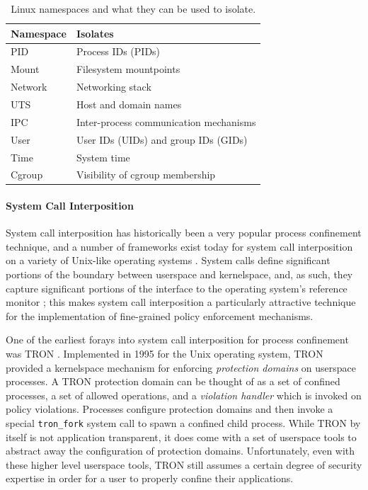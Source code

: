 \documentclass[dvipsnames, 12pt]{article}
\begin{document}
\begin{table}
\begin{tabular}{lp{3in}}
    \toprule
    Namespace & Isolates \\
    \midrule
    \multirow{1}{*}{PID} & Process IDs (PIDs)\\
    \multirow{1}{*}{Mount} & Filesystem mountpoints\\
    \multirow{1}{*}{Network} & Networking stack\\
    \multirow{1}{*}{UTS} & Host and domain names\\
    \multirow{1}{*}{IPC} & Inter-process communication mechanisms\\
    \multirow{1}{*}{User} & User IDs (UIDs) and group IDs (GIDs)\\
    \multirow{1}{*}{Time} & System time\\
    \multirow{1}{*}{Cgroup} & Visibility of cgroup membership\\
    \bottomrule
\end{tabular}
\caption{Linux namespaces and what they can be used to isolate.}
\label{tab:namespaces}
\end{table}

\paragraph*{System Call Interposition} System call interposition has
historically been a very popular process confinement technique, and a number of
frameworks exist today for system call interposition on a variety of Unix-like
operating systems \cite{anderson2017_comparison, padala2002_ptrace,
watson2010_capsicum, pledge}.  System calls define significant portions of the
boundary between userspace and kernelspace, and, as such, they capture
significant portions of the interface to the operating system's reference
monitor \cite{anderson1973_reference_monitor}; this makes system call
interposition a particularly attractive technique for the implementation of
fine-grained policy enforcement mechanisms.

One of the earliest forays into system call interposition for process
confinement was TRON \cite{berman1995_tron}. Implemented in 1995 for the Unix
operating system, TRON provided a kernelspace mechanism for enforcing
\textit{protection domains} on userspace processes. A TRON protection domain can
be thought of as a set of confined processes, a set of allowed operations, and
a \textit{violation handler} which is invoked on policy violations. Processes
configure protection domains and then invoke a special \texttt{tron\_fork}
system call to spawn a confined child process. While TRON by itself is not
application transparent, it does come with a set of userspace tools to abstract
away the configuration of protection domains. Unfortunately, even with these
higher level userspace tools, TRON still assumes a certain degree of security
expertise in order for a user to properly confine their applications.
\end{document}
